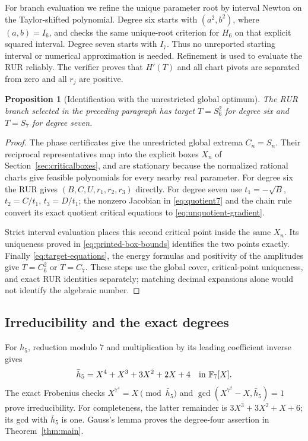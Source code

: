 \documentclass[11pt]{article}
\newtheorem{proposition}[theorem]{Proposition}
\begin{document}
For branch evaluation we refine the unique parameter root by interval
Newton on the Taylor-shifted polynomial. Degree six starts with
$(a^2,b^2)$, where $(a,b)=I_6$, and checks the same unique-root
criterion for $H_6$ on that explicit squared interval. Degree seven
starts with $I_7$. Thus no unreported starting interval or numerical
approximation is needed. Refinement is used to evaluate the RUR reliably.
The verifier proves that $H'(T)$ and all chart pivots are separated from
zero and all $r_j$ are positive.

\begin{proposition}[Identification with the unrestricted global optimum]\label{prop:bridge}
The RUR branch selected in the preceding paragraph has target
$T=S_6^2$ for degree six and $T=S_7$ for degree seven.
\end{proposition}
\begin{proof}
The phase certificates give the unrestricted global extrema $C_n=S_n$.
Their reciprocal representatives map into the explicit boxes $X_n$ of
Section~\ref{sec:criticalboxes}, and are stationary because the normalized
rational charts give feasible polynomials for every nearby real parameter.
For degree six the RUR gives $(B,C,U,r_1,r_2,r_3)$ directly. For degree
seven use $t_1=-\sqrt B$, $t_2=C/t_1$, $t_3=D/t_1$; the nonzero Jacobian
in \eqref{eq:quotient7} and the chain rule convert its exact quotient
critical equations to \eqref{eq:unquotient-gradient}.

Strict interval evaluation places this second critical point inside the
same $X_n$. Its uniqueness proved in \eqref{eq:printed-box-bounds}
identifies the two points exactly. Finally \eqref{eq:target-equations},
the energy formulas and positivity of the amplitudes give $T=C_6^2$
or $T=C_7$. These steps use the global cover, critical-point uniqueness,
and exact RUR identities separately; matching decimal expansions alone
would not identify the algebraic number.
\end{proof}

\subsection{Irreducibility and the exact degrees}\label{sec:irreducibility}
For $h_5$, reduction modulo $7$ and multiplication by its leading
coefficient inverse gives
\[
 \bar h_5=X^4+X^3+3X^2+2X+4\quad\hbox{in }\mathbb F_7[X].
\]
The exact Frobenius checks
$X^{7^4}=X\pmod{\bar h_5}$ and
$\gcd(X^{7^2}-X,\bar h_5)=1$
prove irreducibility. For completeness, the latter remainder is
$3X^3+3X^2+X+6$; its gcd with $\bar h_5$ is one.
Gauss's lemma proves the degree-four assertion in Theorem~\ref{thm:main}.
\end{document}
